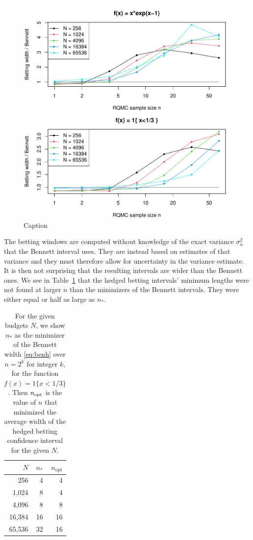 \documentclass{article}
\newcommand{\art}[1]{\begingroup\color{blue}#1\endgroup}
\begin{document}
\begin{figure}[t]
    \centering
    \includegraphics[width=1.\linewidth]{figwidthstoeb}
    \caption{Caption}
    \label{fig:widthstoeb}
\end{figure}

The betting windows are computed without knowledge
of the exact variance $\sigma^2_n$ that the Bennett
interval uses.  They are instead based on estimates
of that variance and they must therefore allow for
uncertainty in the variance estimate.  It is then not
surprising that the resulting intervals are wider
than the Bennett ones. \art{We see in Table~\ref{tab:benvsbetn} that
the hedged betting intervals' minimum lengths were
not found at larger $n$ than the minimizers
of the Bennett intervals. They were either equal
or half as large as $n_*$.}


\begin{table}
\centering
\begin{tabular}{rrr}
\toprule
$N$ & $n_*$ & $n_{\mathrm{opt}}$\\
\midrule
256 &  4   & 4\\
1,024&  8   & 4\\
4,096 & 8   & 8\\
16,384 & 16 & 16\\
65,536 & 32 & 16\\
\bottomrule
\end{tabular}
\caption{\label{tab:benvsbetn}
For the given budgets $N$, we show $n_*$ as the
minimizer of the Bennett width \eqref{eq:benh} 
over $n=2^k$ for integer $k$, for the function
$f(x) = 1\{x<1/3\}$. Then $n_{\operatorname{opt}}$ is
the value of $n$ that minimized the average
width of the hedged betting confidence interval
for the given $N$.
}
\end{table}
\end{document}
